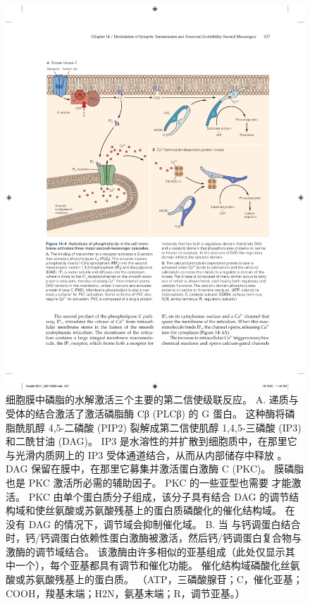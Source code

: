 \begin{figure}[htbp]
	\centering
	\includegraphics[width=0.95\linewidth]{chap14/fig_14_4}
	\caption{细胞膜中磷脂的水解激活三个主要的第二信使级联反应。 A. 递质与受体的结合激活了激活磷脂酶 Cβ (PLCβ) 的 G 蛋白。 这种酶将磷脂酰肌醇 4,5-二磷酸 (PIP2) 裂解成第二信使肌醇 1,4,5-三磷酸 (IP3) 和二酰甘油 (DAG)。 IP3 是水溶性的并扩散到细胞质中，在那里它与光滑内质网上的 IP3 受体通道结合，从而从内部储存中释放 。 DAG 保留在膜中，在那里它募集并激活蛋白激酶 C (PKC)。 膜磷脂也是 PKC 激活所必需的辅助因子。 PKC 的一些亚型也需要  才能激活。 PKC 由单个蛋白质分子组成，该分子具有结合 DAG 的调节结构域和使丝氨酸或苏氨酸残基上的蛋白质磷酸化的催化结构域。 在没有 DAG 的情况下，调节域会抑制催化域。 B. 当  与钙调蛋白结合时，钙/钙调蛋白依赖性蛋白激酶被激活，然后钙/钙调蛋白复合物与激酶的调节域结合。 该激酶由许多相似的亚基组成（此处仅显示其中一个），每个亚基都具有调节和催化功能。 催化结构域磷酸化丝氨酸或苏氨酸残基上的蛋白质。 （ATP，三磷酸腺苷；C，催化亚基；COOH，羧基末端；H2N，氨基末端；R，调节亚基。）}
	\label{fig:14_4}
\end{figure}



